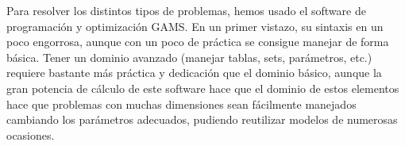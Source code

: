 \documentclass[12pt,a4paper,twoside,openright,titlepage,final]{article}
\begin{document}
Para resolver los distintos tipos de problemas, hemos usado el software de programación y optimización GAMS. En un primer vistazo, su sintaxis en un poco engorrosa, aunque con un poco de práctica se consigue manejar de forma básica. Tener un dominio avanzado (manejar tablas, sets, parámetros, etc.) requiere bastante más práctica y dedicación que el dominio básico, aunque la gran potencia de cálculo de este software hace que el dominio de estos elementos hace que problemas con muchas dimensiones sean fácilmente manejados cambiando los parámetros adecuados, pudiendo reutilizar modelos de numerosas ocasiones.
\end{document}
